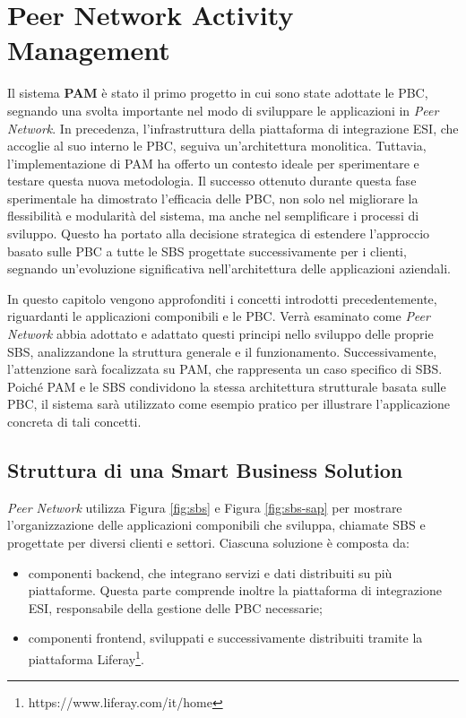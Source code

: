\chapter{Peer Network Activity Management}
\label{chap:pam}

Il sistema \textbf{\ac{PAM}} è stato il primo progetto in cui sono state
adottate le \ac{PBC}, segnando una svolta importante nel modo di sviluppare le applicazioni in \textit{Peer Network}.
In precedenza, l’infrastruttura della piattaforma di integrazione \ac{ESI}, che accoglie al suo interno
le \ac{PBC}, seguiva un’architettura monolitica. Tuttavia, l’implementazione di \ac{PAM} ha offerto un contesto
ideale per sperimentare e testare questa nuova metodologia. Il successo ottenuto
durante questa fase sperimentale ha dimostrato l’efficacia delle \ac{PBC}, non solo nel migliorare la
flessibilità e modularità del sistema, ma anche nel semplificare i processi di sviluppo. Questo ha
portato alla decisione strategica di estendere l’approccio basato sulle \ac{PBC} a tutte le
\ac{SBS} progettate successivamente per i clienti, segnando un’evoluzione
significativa nell’architettura delle applicazioni aziendali.

In questo capitolo vengono approfonditi i concetti introdotti precedentemente, riguardanti
le applicazioni componibili e le \ac{PBC}. Verrà esaminato come \textit{Peer Network} abbia
adottato e adattato questi principi nello sviluppo delle proprie \ac{SBS}, analizzandone la struttura
generale e il funzionamento. Successivamente, l’attenzione sarà focalizzata su \ac{PAM}, che rappresenta un
caso specifico di \ac{SBS}. Poiché \ac{PAM} e le \ac{SBS} condividono la stessa architettura strutturale basata sulle
\ac{PBC}, il sistema sarà utilizzato come esempio pratico per illustrare l’applicazione concreta di tali
concetti.

\section{Struttura di una Smart Business Solution}
\textit{Peer Network} utilizza Figura \ref{fig:sbs} e Figura \ref{fig:sbs-sap} per mostrare l'organizzazione delle
applicazioni componibili che sviluppa,
chiamate \ac{SBS} e progettate per diversi clienti e settori. Ciascuna
soluzione è composta da:
\begin{itemize}
    \item componenti backend, che integrano servizi e dati distribuiti su più piattaforme. Questa parte
    comprende inoltre la piattaforma di integrazione \ac{ESI}, responsabile della gestione delle \ac{PBC}
    necessarie;
    \item componenti frontend, sviluppati e successivamente distribuiti tramite la piattaforma Liferay\footnote{https://www.liferay.com/it/home}.
\end{itemize}

